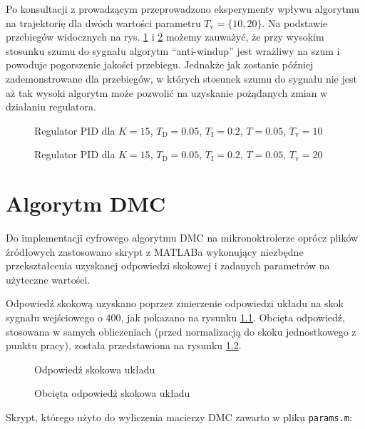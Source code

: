 Po konsultacji z prowadzącym przeprowadzono eksperymenty wpływu algorytmu na trajektorię dla dwóch wartości parametru $T_\mathrm{v} = \{10, 20\}$. Na podstawie przebiegów widocznych na rys. \ref{R11} i \ref{R12} możemy zauważyć, że przy wysokim stosunku szumu do sygnału algorytm ``anti-windup'' jest wrażliwy na szum i powoduje pogorszenie jakości przebiegu. Jednakże jak zostanie później zademonstrowane dla przebiegów, w których stosunek szumu do sygnału nie jest aż tak wysoki algorytm może pozwolić na uzyskanie pożądanych zmian w działaniu regulatora.

\begin{figure}[H]
\centering

\caption{Regulator PID dla $K = 15$, $T_\mathrm{D} = 0.05$, $T_\mathrm{I} = 0.2$, $T = 0.05$, $T_\mathrm{v} = 10$}
\label{R11}
\end{figure}

\begin{figure}[H]
\centering

\caption{Regulator PID dla $K = 15$, $T_\mathrm{D} = 0.05$, $T_\mathrm{I} = 0.2$, $T = 0.05$, $T_\mathrm{v} = 20$}
\label{R12}
\end{figure}


\chapter{Algorytm DMC}

Do implementacji cyfrowego algorytmu DMC na mikronoktrolerze oprócz plików źródłowych zastosowano skrypt z MATLABa wykonujący niezbędne przekształcenia uzyskanej odpowiedzi skokowej i zadanych parametrów na użyteczne wartości.

Odpowiedź skokową uzyskano poprzez zmierzenie odpowiedzi układu na skok sygnału wejściowego o 400, jak pokazano na rysunku \ref{DMC1}. Obcięta odpowiedź, stosowana w samych obliczeniach (przed normalizacją do skoku jednostkowego z punktu pracy), została przedstawiona na rysunku \ref{DMC2}.


\begin{figure}[H]
\centering

\caption{Odpowiedź skokowa układu}
\label{DMC1}
\end{figure}

\begin{figure}[H]
\centering

\caption{Obcięta odpowiedź skokowa układu}
\label{DMC2}
\end{figure}

Skrypt, którego użyto do wyliczenia macierzy DMC zawarto w pliku \verb|params.m|:

